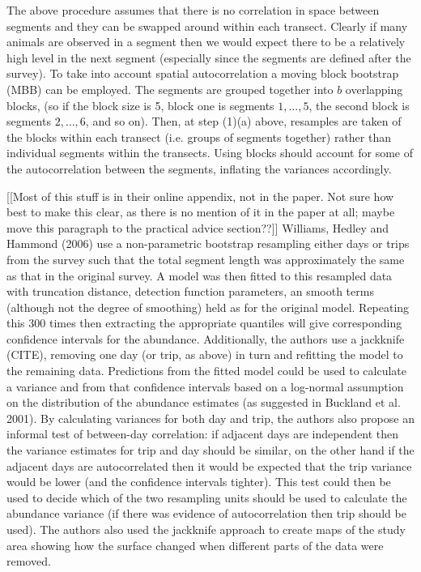 \documentclass[useAMS,referee]{biom}
\begin{document}
The above procedure assumes that there is no correlation in space between segments and they can be swapped around within each transect. Clearly if many animals are observed in a segment then we would expect there to be a relatively high level in the next segment (especially since the segments are defined after the survey). To take into account spatial autocorrelation a moving block bootstrap (MBB) can be employed. The segments are grouped together into $b$ overlapping blocks, (so if the block size is 5, block one is segments $1,\ldots,5$, the second block is segments $2,\ldots,6$, and so on). Then, at step (1)(a) above, resamples are taken of the blocks within each transect (i.e. groups of segments together) rather than individual segments within the transects. Using blocks should account for some of the autocorrelation between the segments, inflating the variances accordingly.


[[Most of this stuff is in their online appendix, not in the paper. Not sure how best to make this clear, as there is no mention of it in the paper at all; maybe move this paragraph to the practical advice section??]] 
Williams, Hedley and Hammond (2006) use a non-parametric bootstrap resampling either days or trips from the survey such that the total segment length was approximately the same as that in the original survey. A model was then fitted to this resampled data with truncation distance, detection function parameters, an smooth terms (although not the degree of smoothing) held as for the original model. Repeating this 300 times then extracting the appropriate quantiles will give corresponding confidence intervals for the abundance. Additionally, the authors use a jackknife (CITE), removing one day (or trip, as above) in turn and refitting the model to the remaining data. Predictions from the fitted model could be used to calculate a variance and from that confidence intervals based on a log-normal assumption on the distribution of the abundance estimates (as suggested in Buckland et al. 2001). By calculating variances for both day and trip, the authors also propose an informal test of between-day correlation: if adjacent days are independent then the variance estimates for trip and day should be similar, on the other hand if the adjacent days are autocorrelated then it would be expected that the trip variance would be lower (and the confidence intervals tighter). This test could then be used to decide which of the two resampling units should be used to calculate the abundance variance (if there was evidence of autocorrelation then trip should be used). The authors also used the jackknife approach to create maps of the study area showing how the surface changed when different parts of the data were removed.
\end{document}
